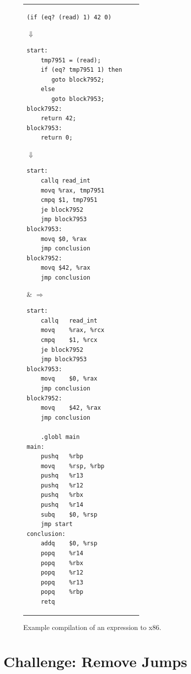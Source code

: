 \documentclass[11pt]{book}
\begin{document}
\begin{figure}[tbp]
\begin{tabular}{lll}
\begin{minipage}{0.5\textwidth}
\begin{lstlisting}
(if (eq? (read) 1) 42 0)
\end{lstlisting}
$\Downarrow$
\begin{lstlisting}
start:
    tmp7951 = (read);
    if (eq? tmp7951 1) then
       goto block7952;
    else
       goto block7953;
block7952:
    return 42;
block7953:
    return 0;
\end{lstlisting}
$\Downarrow$
\begin{lstlisting}
start:
    callq read_int
    movq %rax, tmp7951
    cmpq $1, tmp7951
    je block7952
    jmp block7953
block7953:
    movq $0, %rax
    jmp conclusion
block7952:
    movq $42, %rax
    jmp conclusion
\end{lstlisting}
\end{minipage}
&
$\Rightarrow\qquad$
\begin{minipage}{0.4\textwidth}
\begin{lstlisting}
start:
	callq	read_int
	movq	%rax, %rcx
	cmpq	$1, %rcx
	je block7952
	jmp block7953
block7953:
	movq	$0, %rax
	jmp conclusion
block7952:
	movq	$42, %rax
	jmp conclusion

	.globl main
main:
	pushq	%rbp
	movq	%rsp, %rbp
	pushq	%r13
	pushq	%r12
	pushq	%rbx
	pushq	%r14
	subq	$0, %rsp
	jmp start
conclusion:
	addq	$0, %rsp
	popq	%r14
	popq	%rbx
	popq	%r12
	popq	%r13
	popq	%rbp
	retq
\end{lstlisting}
\end{minipage}
\end{tabular}
\caption{Example compilation of an  expression to x86.}
\label{fig:if-example-x86}
\end{figure}


\section{Challenge: Remove Jumps}
\label{sec:opt-jumps}

\end{document}
